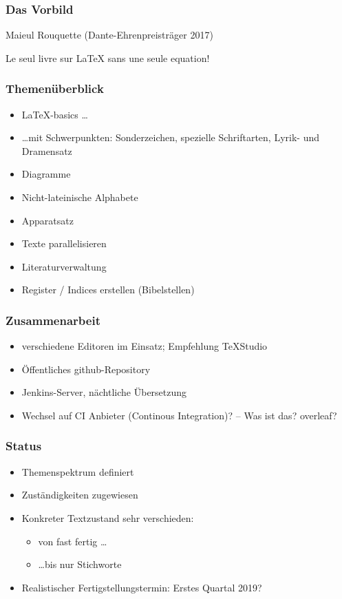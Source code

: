\documentclass[12pt,ngerman]{beamer}
\begin{document}
\begin{frame}
  \frametitle{Das Vorbild}

  Maieul Rouquette (Dante-Ehrenpreisträger 2017)

  Le seul livre sur \LaTeX{} sans une seule equation!
\end{frame}


\begin{frame}
\frametitle{Themenüberblick}

\begin{itemize}
\item \LaTeX-basics \ldots
  \item \ldots mit Schwerpunkten: Sonderzeichen, spezielle Schriftarten, Lyrik- und Dramensatz
\item Diagramme
\item Nicht-lateinische Alphabete
\item Apparatsatz
\item Texte parallelisieren
\item Literaturverwaltung
\item Register / Indices erstellen (Bibelstellen)
\end{itemize}
\end{frame}


\begin{frame}
\frametitle{Zusammenarbeit}

\begin{itemize}
\item verschiedene Editoren im Einsatz; Empfehlung TeXStudio
\item Öffentliches github-Repository
\item Jenkins-Server, nächtliche Übersetzung
\item Wechsel auf CI Anbieter (Continous Integration)? -- Was ist das? overleaf?
\end{itemize}
\end{frame}


\begin{frame}
\frametitle{Status}

\begin{itemize}
\item Themenspektrum definiert
\item Zuständigkeiten zugewiesen
\item Konkreter Textzustand sehr verschieden:
  \begin{itemize}
  \item von fast fertig \ldots
  \item \ldots bis nur Stichworte
  \end{itemize}
\item Realistischer Fertigstellungstermin: Erstes Quartal 2019?
\end{itemize}
\end{frame}
\end{document}
